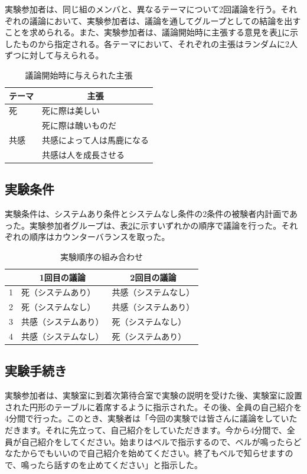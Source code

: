 \documentclass[11pt, a4paper]{jreport} %
\begin{document}
実験参加者は、同じ組のメンバと、異なるテーマについて2回議論を行う。それぞれの議論において、実験参加者は、議論を通してグループとしての結論を出すことを求められる。また、実験参加者は、議論開始時に主張する意見を表\ref{tab:始めの意見}に示したものから指定される。各テーマにおいて、それぞれの主張はランダムに2人ずつに対して与えられる。

\begin{table}[]
\caption{議論開始時に与えられた主張}
\centering
\begin{tabular}{@{}ll@{}}
\toprule
テーマ & \multicolumn{1}{c}{主張} \\ \midrule
死    & 死に際は美しい                \\
     & 死に際は醜いものだ              \\
共感   & 共感によって人は馬鹿になる          \\
     & 共感は人を成長させる             \\ \bottomrule
\end{tabular}
\label{tab:始めの意見}
\end{table}




\subsection{実験条件}
実験条件は、システムあり条件とシステムなし条件の2条件の被験者内計画であった。実験参加者グループは、表\ref{tab:順序}に示すいずれかの順序で議論を行った。それぞれの順序はカウンターバランスを取った。

\begin{table}[]
\caption{実験順序の組み合わせ}
\centering
\label{tab:順序}
\begin{tabular}{@{}lll@{}}
\toprule
  & \multicolumn{1}{c}{1回目の議論} & \multicolumn{1}{c}{2回目の議論} \\ \midrule
1 & 死（システムあり）                  & 共感（システムなし）                 \\
2 & 死（システムなし）                  & 共感（システムあり）                 \\
3 & 共感（システムあり）                 & 死（システムなし）                  \\
4 & 共感（システムなし）                 & 死（システムあり）                  \\ \bottomrule
\end{tabular}
\end{table}


\subsection{実験手続き}
実験参加者は、実験室に到着次第待合室で実験の説明を受けた後、実験室に設置された円形のテーブルに着席するように指示された。その後、全員の自己紹介を4分間で行った。このとき、実験者は「今回の実験では皆さんに議論をしていただきます。それに先立って、自己紹介をしていただきます。今から4分間で、全員が自己紹介をしてください。始まりはベルで指示するので、ベルが鳴ったらどなたからでもいいので自己紹介を始めてください。終了もベルで知らせますので、鳴ったら話すのを止めてください」と指示した。
\end{document}
